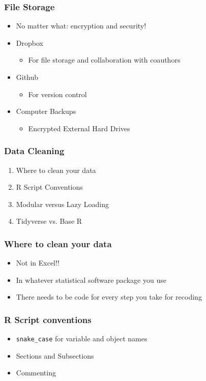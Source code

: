 \documentclass{beamer}
\begin{document}
	\begin{frame}
		\frametitle{File Storage}
		\begin{itemize}	
			\item No matter what: encryption and security!
			\item Dropbox
			\begin{itemize}
				\item For file storage and collaboration with coauthors
			\end{itemize}
			\item Github
			\begin{itemize}
				\item For version control
			\end{itemize}
			\item Computer Backups
			\begin{itemize}
				\item Encrypted External Hard Drives
			\end{itemize}
		\end{itemize}
	\end{frame}
	\begin{frame}
		\frametitle{Data Cleaning}
		\begin{enumerate}
			\item Where to clean your data
			\item R Script Conventions
			\item Modular versus Lazy Loading
			\item Tidyverse vs. Base R
		\end{enumerate}
	\end{frame}
	\begin{frame}
		\frametitle{Where to clean your data}
		\begin{itemize}
			\item Not in Excel!!
			\item In whatever statistical software package you use
			\item There needs to be code for every step you take for recoding
		\end{itemize}
	\end{frame}
	\begin{frame}
		\frametitle{R Script conventions}
		\begin{itemize}
			\item \texttt{snake\_case} for variable and object names
			\item Sections and Subsections
			\item Commenting
		\end{itemize}
	\end{frame}
\end{document}
